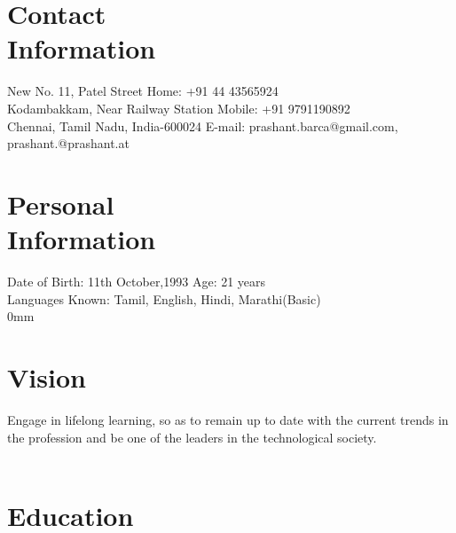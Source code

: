 \documentclass[margin,line]{resume}
\begin{document}
\begin{resume}

    \section{\mysidestyle Contact\\Information}

    New No. 11, Patel Street                            \hfill Home: +91 44 43565924          \vspace{0mm}\\\vspace{0mm}%
    Kodambakkam, Near Railway Station                          \hfill Mobile: +91 9791190892          \vspace{0mm}\\\vspace{0mm}%
    Chennai, Tamil Nadu, India-600024      
    \hfill E-mail: prashant.barca@gmail.com, \vspace{0mm}\\\vspace{-4.5mm}%
    \hfill prashant.@prashant.at \vspace{0mm}\\\vspace{-4.5mm}%

	\section{\mysidestyle Personal\\Information}

Date of Birth: 11th October,1993      \hfill Age: 21 years \vspace{0mm}\\\vspace{0mm}%
Languages Known: Tamil, English, Hindi, Marathi(Basic) \vspace{0mm}\\\vspace
{0mm}%
    \section{\mysidestyle Vision}

Engage in lifelong learning, so as to remain up to date with the current trends in the profession and be one of the leaders in the technological society. 
    \\\\\section{\mysidestyle Education}


\end{resume}
\end{document}
